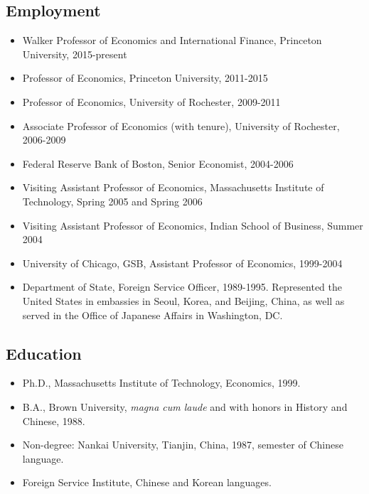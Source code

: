 \documentclass[12pt]{article}
\begin{document}
\thispagestyle{firstpage}
\vspace*{2\baselineskip}
 \afterpage{\aftergroup\restoregeometry}

\subsection*{Employment}

\begin{itemize}[left=0pt .. \parindent, label=]
\item Walker Professor of Economics and International Finance, Princeton
University, 2015-present

\item Professor of Economics, Princeton University, 2011-2015

\item Professor of Economics, University of Rochester, 2009-2011

\item Associate Professor of Economics (with tenure), University of Rochester,
2006-2009

\item Federal Reserve Bank of Boston, Senior Economist, 2004-2006

\item Visiting Assistant Professor of Economics, Massachusetts Institute of
Technology, Spring 2005 and Spring 2006 

\item Visiting Assistant Professor of Economics, Indian School of Business,
Summer 2004

\item University of Chicago, GSB, Assistant Professor of Economics, 1999-2004

\item Department of State, Foreign Service Officer, 1989-1995. Represented the
United States in embassies in Seoul, Korea, and Beijing, China, as well
as served in the Office of Japanese Affairs in Washington, DC.

\end{itemize}

\subsection*{Education}

\begin{itemize}[left=0pt .. \parindent, label=]
\item Ph.D., Massachusetts Institute of Technology, Economics, 1999.

\item B.A., Brown University, \textit{magna cum laude} and with honors in History and
Chinese, 1988.

\item Non-degree: Nankai University, Tianjin, China, 1987, semester of Chinese
language.

\item Foreign Service Institute, Chinese and Korean languages.
\end{itemize}
\end{document}
